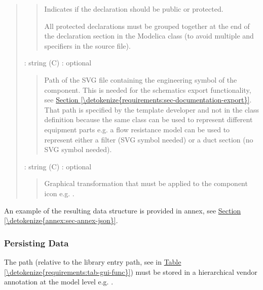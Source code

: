\documentclass[letterpaper,10pt, openany,english]{sphinxmanual}
\begin{document}
\begin{quote}
\begin{quote}
\begin{DUlineblock}{0em}
\item[] Indicates if the declaration should be public or protected.
\item[] All protected declarations must be grouped together at the end of the declaration section in the Modelica class (to avoid multiple  and  specifiers in the source file).
\end{DUlineblock}
\end{quote}

 : string (C) : optional
\begin{quote}

Path of the SVG file containing the engineering symbol of the component. This is needed for the schematics export functionality, see \hyperref[\detokenize{requirements:sec-documentation-export}]{Section \ref{\detokenize{requirements:sec-documentation-export}}}. That path is specified by the template developer and not in the class definition because the same class can be used to represent different equipment parts e.g. a flow resistance model can be used to represent either a filter (SVG symbol needed) or a duct section (no SVG symbol needed).
\end{quote}

 : string (C) : optional
\begin{quote}

Graphical transformation that must be applied to the component icon e.g. .
\end{quote}
\end{quote}

An example of the resulting data structure is provided in annex, see \hyperref[\detokenize{annex:sec-annex-json}]{Section \ref{\detokenize{annex:sec-annex-json}}}.


\subsubsection{Persisting Data}
\label{\detokenize{requirements:persisting-data}}\label{\detokenize{requirements:sec-persisting-data}}

The path (relative to the library entry path, see  in \hyperref[\detokenize{requirements:tab-gui-func}]{Table \ref{\detokenize{requirements:tab-gui-func}}}) must be stored in a hierarchical vendor annotation at the model level e.g. .
\end{document}
